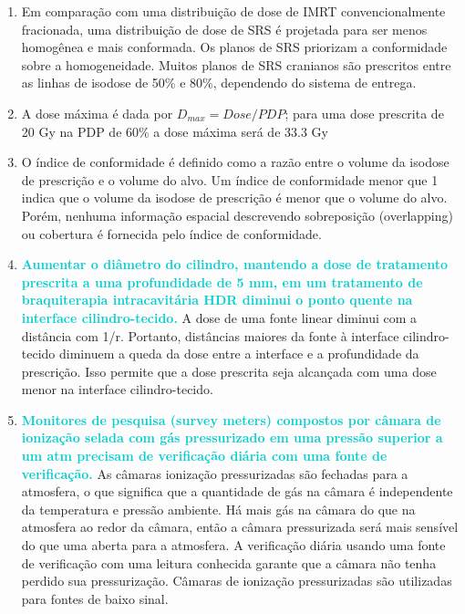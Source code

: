 \documentclass[11pt,a4paper]{article}
\begin{document}
\begin{enumerate}
        \item Em comparação com uma distribuição de dose de IMRT convencionalmente fracionada, uma distribuição de dose de SRS é projetada para ser menos homogênea e mais conformada. Os planos de SRS priorizam a conformidade sobre a homogeneidade. Muitos planos de SRS cranianos são prescritos entre as linhas de isodose de 50\% e 80\%, dependendo do sistema de entrega.

        \item A dose máxima é dada por $D_{max} = Dose/PDP$; para uma dose prescrita de 20 Gy na PDP de 60\% a dose máxima será de 33.3 Gy

        \item O índice de conformidade é definido como a razão entre o volume da isodose de prescrição e o volume do alvo. Um índice de conformidade menor que 1 indica que o volume da isodose de prescrição é menor que o volume do alvo. Porém, nenhuma informação espacial descrevendo sobreposição (overlapping) ou cobertura é fornecida pelo índice de conformidade.

        \item \textcolor{DarkTurquoise}{\textbf{Aumentar o diâmetro do cilindro, mantendo a dose de tratamento prescrita a uma profundidade de 5 mm, em um tratamento de braquiterapia intracavitária HDR diminui o ponto quente na interface cilindro-tecido.}} A dose de uma fonte linear diminui com a distância com 1/r. Portanto, distâncias maiores da fonte à interface cilindro-tecido diminuem a queda da dose entre a interface e a profundidade da prescrição. Isso permite que a dose prescrita seja alcançada com uma dose menor na interface cilindro-tecido. 

        \item \textcolor{DarkTurquoise}{\textbf{Monitores de pesquisa (survey meters) compostos por câmara de ionização selada com gás pressurizado em uma pressão superior a um atm precisam de verificação diária com uma fonte de verificação.}} As câmaras ionização pressurizadas são fechadas para a atmosfera, o que significa que a quantidade de gás na câmara é independente da temperatura e pressão ambiente. Há mais gás na câmara do que na atmosfera ao redor da câmara, então a câmara pressurizada será mais sensível do que uma aberta para a atmosfera. A verificação diária usando uma fonte de verificação com uma leitura conhecida garante que a câmara não tenha perdido sua pressurização. Câmaras de ionização pressurizadas são utilizadas para fontes de baixo sinal.


\end{enumerate}
\end{document}
